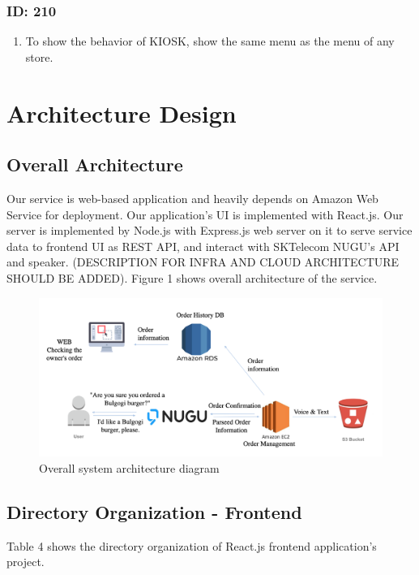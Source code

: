 \documentclass[conference,compsoc]{IEEEtran}
\begin{document}
\subsubsection{ID: 210}
\begin{enumerate}
  \item To show the behavior of KIOSK, show the same menu as the menu of any store.
\end{enumerate}

\section{Architecture Design}

\subsection{Overall Architecture}

Our service is web-based application and heavily depends on Amazon Web Service for deployment. Our application's UI is implemented with React.js. Our server is implemented by Node.js with Express.js web server on it to serve service data to frontend UI as REST API, and interact with SKTelecom NUGU's API and speaker. (DESCRIPTION FOR INFRA AND CLOUD ARCHITECTURE SHOULD BE ADDED). Figure 1 shows overall architecture of the service.

\begin{figure}[h!]
  \includegraphics[width=\linewidth]{figures/architecture.png}
  \caption{Overall system architecture diagram}
  \label{fig:architecture}
\end{figure}

\subsection{Directory Organization - Frontend}

Table 4 shows the directory organization of React.js frontend application's project.
\end{document}
